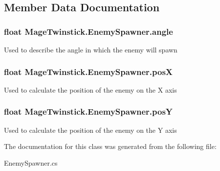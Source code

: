 \subsection{Member Data Documentation}
\hypertarget{class_mage_twinstick_1_1_enemy_spawner_ae8e524a6c9480737390fcf8903c924b7}{}
\subsubsection[{angle}]{\setlength{\rightskip}{0pt plus 5cm}float Mage\+Twinstick.\+Enemy\+Spawner.\+angle\hspace{0.3cm}{\ttfamily [protected]}}\label{class_mage_twinstick_1_1_enemy_spawner_ae8e524a6c9480737390fcf8903c924b7}
Used to describe the angle in which the enemy will spawn \hypertarget{class_mage_twinstick_1_1_enemy_spawner_afae9c62c10aab60fb5232880bdc58eef}{}
\subsubsection[{pos\+X}]{\setlength{\rightskip}{0pt plus 5cm}float Mage\+Twinstick.\+Enemy\+Spawner.\+pos\+X\hspace{0.3cm}{\ttfamily [protected]}}\label{class_mage_twinstick_1_1_enemy_spawner_afae9c62c10aab60fb5232880bdc58eef}
Used to calculate the position of the enemy on the X axis \hypertarget{class_mage_twinstick_1_1_enemy_spawner_a202528664dcf4d1107551469b7147a36}{}
\subsubsection[{pos\+Y}]{\setlength{\rightskip}{0pt plus 5cm}float Mage\+Twinstick.\+Enemy\+Spawner.\+pos\+Y\hspace{0.3cm}{\ttfamily [protected]}}\label{class_mage_twinstick_1_1_enemy_spawner_a202528664dcf4d1107551469b7147a36}
Used to calculate the position of the enemy on the Y axis 

The documentation for this class was generated from the following file\+:\begin{DoxyCompactItemize}
\item 
Enemy\+Spawner.\+cs\end{DoxyCompactItemize}
